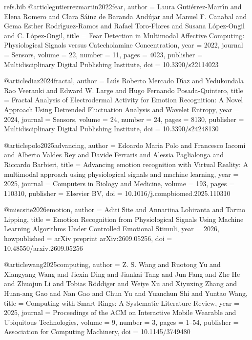 \begin{filecontents*}[overwrite]{refs.bib}
@article{gutierrezmartin2022fear,
  author = {Laura Guti{\'e}rrez-Mart{\'\i}n and Elena Romero and Clara S{\'a}inz de Baranda And{\'u}jar and Manuel F. Canabal and Gema Esther Rodr{\'\i}guez-Ramos and Rafael Toro-Flores and Susana L{\'o}pez{-}Ongil and C. L{\'o}pez-Ongil},
  title = {{Fear Detection in Multimodal Affective Computing: Physiological Signals versus Catecholamine Concentration}},
  year = {2022},
  journal = {Sensors},
  volume = {22},
  number = {11},
  pages = {4023},
  publisher = {Multidisciplinary Digital Publishing Institute},
  doi = {10.3390/s22114023}
}

@article{diaz2024fractal,
  author = {Lu{\'\i}s Roberto Mercado D{\'\i}az and Yedukondala Rao Veeranki and Edward W. Large and Hugo Fernando Posada-Quintero},
  title = {{Fractal Analysis of Electrodermal Activity for Emotion Recognition: A Novel Approach Using Detrended Fluctuation Analysis and Wavelet Entropy}},
  year = {2024},
  journal = {Sensors},
  volume = {24},
  number = {24},
  pages = {8130},
  publisher = {Multidisciplinary Digital Publishing Institute},
  doi = {10.3390/s24248130}
}

@article{polo2025advancing,
  author = {Edoardo Maria Polo and Francesco Iacomi and Alberto Valdes Rey and Davide Ferraris and Alessia Paglialonga and Riccardo Barbieri},
  title = {{Advancing emotion recognition with Virtual Reality: A multimodal approach using physiological signals and machine learning}},
  year = {2025},
  journal = {Computers in Biology and Medicine},
  volume = {193},
  pages = {110310},
  publisher = {Elsevier BV},
  doi = {10.1016/j.compbiomed.2025.110310}
}

@misc{site2026emotion,
  author = {Aditi Site and Annariina Lohiranta and Tarmo Lipping},
  title = {{Emotion Recognition from Physiological Signals Using Machine Learning Algorithms Under Controlled Emotional Stimuli}},
  year = {2026},
  howpublished = {arXiv preprint arXiv:2609.05256},
  doi = {10.48550/arxiv.2609.05256}
}

@article{wang2025computing,
  author = {Z. S. Wang and Ruotong Yu and Xiangyang Wang and Jiexin Ding and Jiankai Tang and Jun Fang and Zhe He and Zhuojun Li and Tobias R{\"o}ddiger and Weiye Xu and Xiyuxing Zhang and Huan-ang Gao and Nan Gao and Chun Yu and Yuanchun Shi and Yuntao Wang},
  title = {{Computing with Smart Rings: A Systematic Literature Review}},
  year = {2025},
  journal = {Proceedings of the ACM on Interactive Mobile Wearable and Ubiquitous Technologies},
  volume = {9},
  number = {3},
  pages = {1--54},
  publisher = {Association for Computing Machinery},
  doi = {10.1145/3749480}
}


\end{filecontents*}

